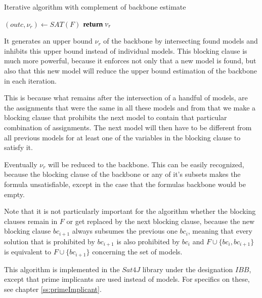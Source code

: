 \begin{algorithm}
\caption{{\sc Iterative algorithm with complement of backbone estimate}}
\label{alg:ibb}
\DontPrintSemicolon
{}
$(outc,\nu_r) \gets SAT(F)$\;
$\Return \; \nu_r$\;
\end{algorithm}

It generates an upper bound $\nu_r$ of the backbone by intersecting found models and inhibits this upper bound instead of individual models. This blocking clause is much more powerful, because it enforces not only that a new model is found, but also that this new model will reduce the upper bound estimation of the backbone in each iteration. 

This is because what remains after the intersection of a handful of models, are the assignments that were the same in all these models and from that we make a blocking clause that prohibits the next model to contain that particular combination of assignments. The next model will then have to be different from all previous models for at least one of the variables in the blocking clause to satisfy it.

Eventually $\nu_r$ will be reduced to the backbone. This can be easily recognized, because the blocking clause of the backbone or any of it's subsets makes the formula unsatisfiable, except in the case that the formulas backbone would be empty. 

Note that it is not particularly important for the algorithm whether the blocking clauses remain in $F$ or get replaced by the next blocking clause, because the new blocking clause $bc_{i+1}$ always subsumes the previous one $bc_i$, meaning that every solution that is prohibited by $bc_{i+1}$ is also prohibited by $bc_i$ and $F \cup \{bc_i , bc_{i+1}\}$ is equivalent to $F \cup \{bc_{i+1}\}$ concerning the set of models.

This algorithm is implemented in the $Sat4J$ library under the designation $IBB$, except that prime implicants are used instead of models. For specifics on these, see chapter \ref{ss:primeImplicant}. 


